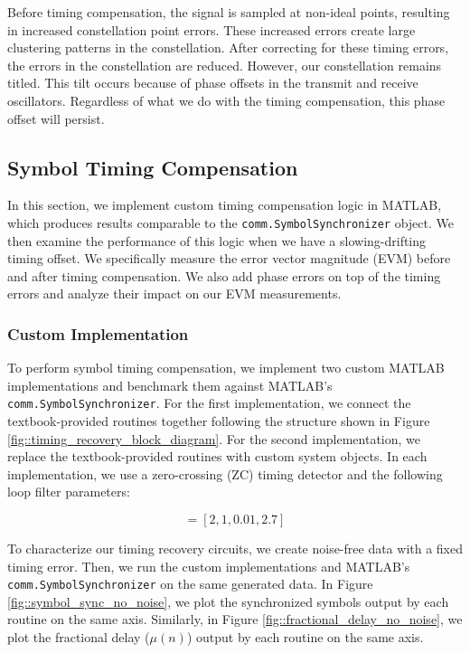 \documentclass{article}
\begin{document}
\noindent Before timing compensation, the signal is sampled at non-ideal points, resulting in increased constellation point errors. These increased errors create large clustering patterns in the constellation. After correcting for these timing errors, the errors in the constellation are reduced. However, our constellation remains titled. This tilt occurs because of phase offsets in the transmit and receive oscillators. Regardless of what we do with the timing compensation, this phase offset will persist.

\subsection{Symbol Timing Compensation}
\label{section::symbol_timing_compensation}

In this section, we implement custom timing compensation logic in MATLAB, which produces results comparable to the \texttt{comm.SymbolSynchronizer} object. We then examine the performance of this logic when we have a slowing-drifting timing offset. We specifically measure the error vector magnitude (EVM) before and after timing compensation. We also add phase errors on top of the timing errors and analyze their impact on our EVM measurements.

\subsubsection{Custom Implementation}

To perform symbol timing compensation, we implement two custom MATLAB implementations and benchmark them against MATLAB's \texttt{comm.SymbolSynchronizer}. For the first implementation, we connect the textbook-provided routines together following the structure shown in Figure \ref{fig::timing_recovery_block_diagram}. For the second implementation, we replace the textbook-provided routines with custom system objects. In each implementation, we use a zero-crossing (ZC) timing detector and the following loop filter parameters:

\begin{equation*}
	[N, \zeta, B_{loop}, G_D] = [2, 1, 0.01, 2.7]
\end{equation*}

\noindent To characterize our timing recovery circuits, we create noise-free data with a fixed timing error. Then, we run the custom implementations and MATLAB's \texttt{comm.SymbolSynchronizer} on the same generated data. In Figure \ref{fig::symbol_sync_no_noise}, we plot the synchronized symbols output by each routine on the same axis. Similarly, in Figure \ref{fig::fractional_delay_no_noise}, we plot the fractional delay ($\mu(n)$) output by each routine on the same axis.
\end{document}
